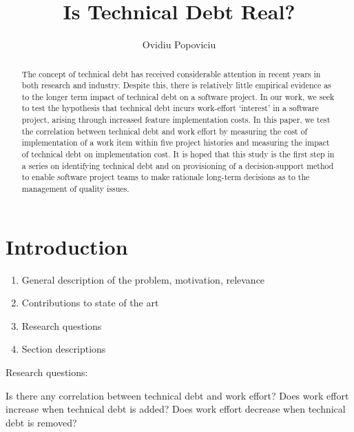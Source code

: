 \documentclass{mpaper}
\begin{document}
\title{Is Technical Debt Real?}
\author{Ovidiu Popoviciu}


\maketitle


\begin{abstract}
The concept of technical debt has received considerable attention in recent
years in both research and industry. Despite this, there is relatively little
empirical evidence as to the longer term impact of technical debt on a software
project. In our work, we seek to test the hypothesis that technical debt incurs
work-effort `interest' in a software project, arising through increased feature
implementation costs. In this paper, we test the correlation between technical
debt and work effort by measuring the cost of implementation of a work item
within five project histories and measuring the impact of technical debt on
implementation cost. It is hoped that this study is the first step in a series
on identifying technical debt and on provisioning of a decision-support method
to enable software project teams to make rationale long-term decisions as to the
management of quality issues. 
\end{abstract}

\section{Introduction}
\label{introduction}

\begin{enumerate}
  \item General description of the problem, motivation, relevance
  \item Contributions to state of the art 
  \item Research questions
  \item Section descriptions
\end{enumerate}

Research questions:

Is there any correlation between technical debt and work effort?
Does work effort increase when technical debt is added?
Does work effort decrease when technical debt is removed?
\end{document}
